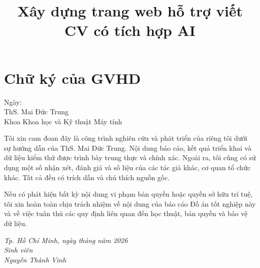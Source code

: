\documentclass[12pt,a4paper,oneside]{book}
\title{Xây dựng trang web hỗ trợ viết CV có tích hợp AI}
\begin{document}
\begingroup
\setlength{\parindent}{0pt}
\coverpage
\endgroup
\frontmatter

\section*{\LARGE Chữ ký của GVHD}
\thispagestyle{empty}
\fontsize{15}{25}\selectfont
\vspace{2.25cm}
\noindent \underline{\hspace{10cm}} Ngày: \underline{\hspace{3cm}}\\
ThS. Mai Đức Trung\\
Khoa Khoa học và Kỹ thuật Máy tính
\clearpage
\normalsize

\begin{declaration}
  Tôi xin cam đoan đây là công trình nghiên cứu và phát triển của riêng tôi dưới sự hướng dẫn của ThS. Mai Đức Trung. Nội dung báo cáo, kết quả triển khai và dữ liệu kiểm thử được trình bày trung thực và chính xác. Ngoài ra, tôi cũng có sử dụng một số nhận xét, đánh giá và số liệu của các tác giả khác, cơ quan tổ chức khác. Tất cả đều có trích dẫn và chú thích nguồn gốc.


  Nếu có phát hiện bất kỳ nội dung vi phạm bản quyền hoặc quyền sở hữu trí tuệ, tôi xin hoàn toàn chịu trách nhiệm về nội dung của báo cáo Đồ án tốt nghiệp này và về việc tuân thủ các quy định liên quan đến học thuật, bản quyền và bảo vệ dữ liệu.

  \begin{flushright}
    \textit{Tp. Hồ Chí Minh, ngày \underline{\hspace{1cm}} tháng \underline{\hspace{1cm}} năm 2026\\}
    \textit{Sinh viên\\}
    \textit{Nguyễn Thành Vinh}
  \end{flushright}
\end{declaration}
\end{document}
